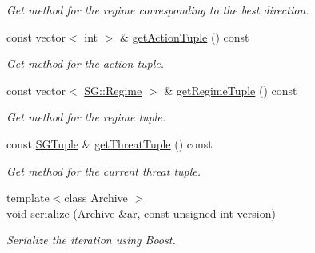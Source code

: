 \begin{DoxyCompactItemize}
\begin{DoxyCompactList}\small\item\em Get method for the regime corresponding to the best direction. \end{DoxyCompactList}\item 
\mbox{\label{classSGIteration_a2b8d87df8e7c5cc825938c0f57368c21}} 
const vector$<$ int $>$ \& \hyperlink{classSGIteration_a2b8d87df8e7c5cc825938c0f57368c21}{get\+Action\+Tuple} () const
\begin{DoxyCompactList}\small\item\em Get method for the action tuple. \end{DoxyCompactList}\item 
\mbox{\label{classSGIteration_aefc7abf8f1819c34acf04f313d8908d2}} 
const vector$<$ \hyperlink{namespaceSG_a139e4dec41ea0f38aae1f93f60cfff60}{S\+G\+::\+Regime} $>$ \& \hyperlink{classSGIteration_aefc7abf8f1819c34acf04f313d8908d2}{get\+Regime\+Tuple} () const
\begin{DoxyCompactList}\small\item\em Get method for the regime tuple. \end{DoxyCompactList}\item 
\mbox{\label{classSGIteration_a1480e56c07b27be906de438b105945da}} 
const \hyperlink{classSGTuple}{S\+G\+Tuple} \& \hyperlink{classSGIteration_a1480e56c07b27be906de438b105945da}{get\+Threat\+Tuple} () const
\begin{DoxyCompactList}\small\item\em Get method for the current threat tuple. \end{DoxyCompactList}\item 
\mbox{\label{classSGIteration_a19860e6d2af702df4ce47e36d4d43ec5}} 
{\footnotesize template$<$class Archive $>$ }\\void \hyperlink{classSGIteration_a19860e6d2af702df4ce47e36d4d43ec5}{serialize} (Archive \&ar, const unsigned int version)
\begin{DoxyCompactList}\small\item\em Serialize the iteration using Boost. \end{DoxyCompactList}\end{DoxyCompactItemize}
